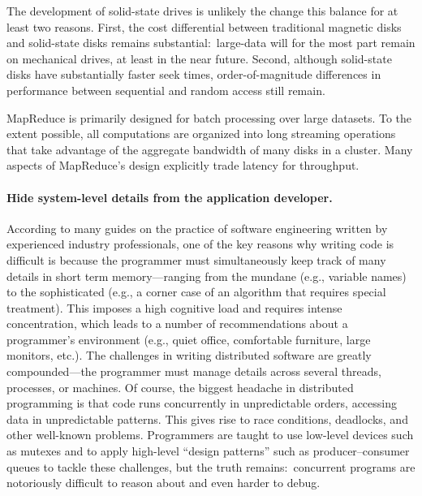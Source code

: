 The development of solid-state drives is unlikely the change this
balance for at least two reasons.  First, the cost differential
between traditional magnetic disks and solid-state disks remains
substantial:\ large-data will for the most part remain on mechanical
drives, at least in the near future.  Second, although solid-state
disks have substantially faster seek times, order-of-magnitude
differences in performance between sequential and random access still
remain.

MapReduce is primarily designed for batch processing over large
datasets.  To the extent possible, all computations are organized into
long streaming operations that take advantage of the aggregate
bandwidth of many disks in a cluster.  Many aspects of MapReduce's
design explicitly trade latency for throughput.

\paragraph{Hide system-level details from the application developer.}  
According to many guides on the practice of software engineering
written by experienced industry professionals, one of the key reasons
why writing code is difficult is because the programmer must
simultaneously keep track of many details in short term
memory---ranging from the mundane (e.g., variable names) to the
sophisticated (e.g., a corner case of an algorithm that requires
special treatment).  This imposes a high cognitive load and requires
intense concentration, which leads to a number of recommendations
about a programmer's environment (e.g., quiet office, comfortable
furniture, large monitors, etc.).  The challenges in writing
distributed software are greatly compounded---the programmer must
manage details across several threads, processes, or machines.  Of
course, the biggest headache in distributed programming is that code
runs concurrently in unpredictable orders, accessing data in
unpredictable patterns.  This gives rise to race conditions,
deadlocks, and other well-known problems.  Programmers are taught to
use low-level devices such as mutexes and to apply high-level ``design
patterns'' such as producer--consumer queues to tackle these
challenges, but the truth remains:\ concurrent programs are
notoriously difficult to reason about and even harder to debug.

